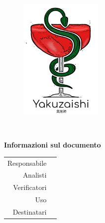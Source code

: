 \thispagestyle{empty}

\begin{figure}
	\centering
	\includegraphics[width=150px]{../template/images/logo}
\end{figure}

\hspace{5pt}

\begin{center}
	\textbf{\Large \documentName}\\[0.2cm]
\end{center}

\vspace{5pt}

\begin{center}
	\groupEmail
\end{center}

\vspace{5pt}

\begin{center}
	\textbf{Informazioni sul documento}
\end{center}

\begin{table}[H]
	\centering
	\renewcommand{\arraystretch}{1.4}
	\begin{tabular}{r|l}
		Responsabile & \documentApprovers\vspace{2.5pt}\\
		Analisti & \documentEditors\vspace{2.5pt}\\
		Verificatori & \documentVerifiers\vspace{2.5pt}\\
		Uso & \documentUsage\vspace{2.5pt}\\
		Destinatari & \documentAddressee\\
	\end{tabular}
\end{table}

